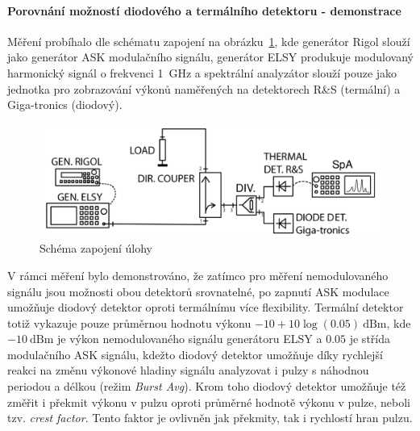 \documentclass[11pt,a4paper]{article}
\newcommand{\dBm}{\mathrm{dBm}}
\begin{document}
\paragraph*{Porovnání možností diodového a termálního detektoru - demonstrace} Měření probíhalo dle schématu zapojení na obrázku~\ref{fig:task1-zapojeni}, kde generátor Rigol slouží jako generátor ASK modulačního signálu, generátor ELSY produkuje modulovaný harmonický signál o frekvenci 1~GHz a spektrální analyzátor slouží pouze jako jednotka pro zobrazování výkonů naměřených na detektorech R\&S (termální) a Giga-tronics (diodový).
\begin{figure}[!ht]
    \centering
    \includegraphics[width=.8\textwidth]{src/task1-zapojeni.png}
    \caption{\label{fig:task1-zapojeni}Schéma zapojení úlohy}
\end{figure}
V rámci měření bylo demonstrováno, že zatímco pro měření nemodulovaného signálu jsou možnosti obou detektorů srovnatelné, po zapnutí ASK modulace umožňuje diodový detektor oproti termálnímu více flexibility. Termální detektor totiž vykazuje pouze průměrnou hodnotu výkonu $-10+10\log(0.05)\ \dBm$, kde $-10\ \dBm$ je výkon nemodulovaného signálu generátoru ELSY a $0.05$ je střída modulačního ASK signálu, kdežto diodový detektor umožňuje díky rychlejší reakci na změnu výkonové hladiny signálu analyzovat i pulzy s náhodnou periodou a délkou (režim \emph{Burst Avg}). Krom toho diodový detektor umožňuje též změřit i překmit výkonu v pulzu oproti průměrné hodnotě výkonu v pulze, neboli tzv. \emph{crest factor}. Tento faktor je ovlivněn jak překmity, tak i rychlostí hran pulzu.

\end{document}
